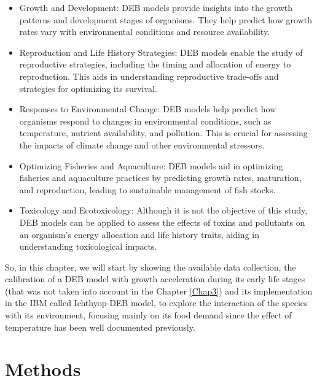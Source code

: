 \begin{itemize}
  \item Growth and Development: DEB models provide insights into the growth patterns and development stages of organisms. They help predict how growth rates vary with environmental conditions and resource availability.\\
  
  \item Reproduction and Life History Strategies: DEB models enable the study of reproductive strategies, including the timing and allocation of energy to reproduction. This aids in understanding reproductive trade-offs and strategies for optimizing its survival.\\
  
  \item 	Responses to Environmental Change: DEB models help predict how organisms respond to changes in environmental conditions, such as temperature, nutrient availability, and pollution. This is crucial for assessing the impacts of climate change and other environmental stressors.\\
  
  \item Optimizing Fisheries and Aquaculture: DEB models aid in optimizing fisheries and aquaculture practices by predicting growth rates, maturation, and reproduction, leading to sustainable management of fish stocks.\\
  
  \item Toxicology and Ecotoxicology: Although it is not the objective of this study, DEB models can be applied to assess the effects of toxins and pollutants on an organism's energy allocation and life history traits, aiding in understanding toxicological impacts.\\

\end{itemize}

So, in this chapter, we will start by showing the available data collection, the calibration of a DEB model with growth acceleration during its early life stages (that was not taken into account in the Chapter \ref{Chap3}) and its implementation in the IBM called Ichthyop-DEB model, to explore the interaction of the species with its environment, focusing mainly on its food demand since the effect of temperature has been well documented previously.

\section{Methods}\label{Chap4Meth}

